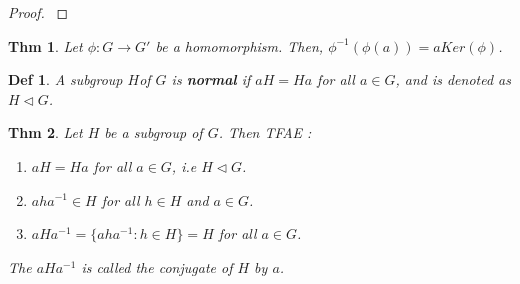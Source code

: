 \documentclass[paper=a4, fontsize=11pt]{scrartcl}
\newcommand{\nextline}{$ $ \newline \vspace{-0.15in}}
\newtheorem{theorem}{Thm}
\newtheorem{definition}{Def}
\begin{document}
\begin{proof}
\nextline
{}
\end{proof}

\begin{theorem}
	Let $\phi : G \to G'$ be a homomorphism. Then, $\phi^{-1}\left( \phi(a) \right) = a Ker(\phi)$.\\
\end{theorem}

\begin{definition}
	A subgroup $H$of $G$ is \textbf{normal} if $aH=Ha$ for all $a\in G$, and is denoted as $H \triangleleft G$.\\
\end{definition}

\begin{theorem}
	Let $H$ be a subgroup of $G$. Then TFAE : 
	\begin{enumerate}[label=\arabic*)]
		\item $aH=Ha$ for all $a\in G$, i.e $H\triangleleft G$.
		\item $aha^{-1}\in H$ for all $h\in H$ and $a\in G$.
		\item $aHa^{-1} = \{ aha^{-1} : h\in H \} = H$ for all $a\in G$.
	\end{enumerate}
	The $aHa^{-1}$ is called the conjugate of $H$ by $a$.
\end{theorem}

\vspace{0.15in}
\end{document}
